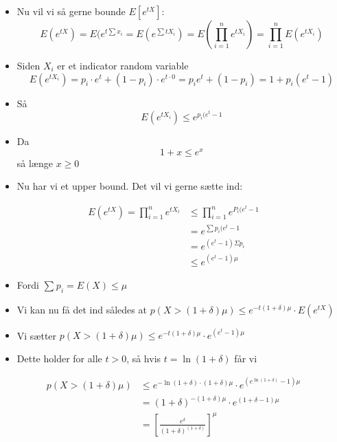 \documentclass{beamer}
\begin{document}
\begin{frame}[allowframebreaks]
\begin{itemize}
\item Nu vil vi så gerne bounde $E[e^{tX}]$: \[ E(e^{tX}) = E(e^{t \sum x_{i}} = E(e^{\sum t X_{i}}) = E( \prod_{i=1}^{n}e^{tX_{i}}) = \prod_{i=1}^{n} E(e^{tX_{i}}) \]
\item Siden $X_{i}$ er et indicator random variable \[ E(e^{tX_{i}}) = p_{i} \cdot e^{t}+ (1-p_{i}) \cdot e^{t\cdot 0} = p_{i}e^{t} + (1-p_{i}) = 1 + p_{i}(e^{t}-1) \]
\item Så \[ E(e^{tX_{i}}) \leq e^{p_{i} (e^{t}-1} \]
\item Da \[ 1 + x \leq e^{x} \] så længe $x \geq 0$
\item Nu har vi et upper bound. Det vil vi gerne sætte ind:  
\end{itemize}

\begin{equation}
\begin{split}
  E(e^{tX}) = \prod_{i=1}^{n}e^{tX_{i}} &\leq \prod_{i=1}^{n} e^{P_{i}(e^{t}-1} \\
                                    &= e^{\sum p_{i} (e^{t}-1}\\
                                    &= e^{(e^{t}-1) \Sigma p_{i}}\\
  &\leq e^{(e^{t}-1)\mu}
\end{split}

\end{equation}

\begin{itemize}
\item Fordi $\sum_{}^{}p_{i} = E(X) \leq \mu$
\item Vi kan nu få det ind således at $p(X > (1 + \delta) \mu) \leq e^{-t(1 + \delta) \mu} \cdot E(e^{tX})$
\item Vi sætter $p(X > (1+\delta)\mu) \leq e^{-t (1+\delta) \mu} \cdot e^{(e^{t}-1)\mu}$
\item Dette holder for alle $t > 0$, så hvis $t = \ln (1+ \delta)$ får vi 
\end{itemize}


\begin{equation*}
  \begin{split}
    p(X > (1 + \delta) \mu) &\leq e^{-\ln(1 + \delta) \cdot (1 + \delta) \mu} \cdot e^{(e^{\ln (1 + \delta)}-1) \mu}\\
                     &= (1+ \delta)^{-(1+ \delta) \mu} \cdot e^{(1 + \delta-1) \mu}\\
    &= \left[ \frac{e^{\delta}}{(1+\delta)^{(1+\delta)}} \right]^{\mu}
  \end{split}
\end{equation*}


\end{frame}
\end{document}
